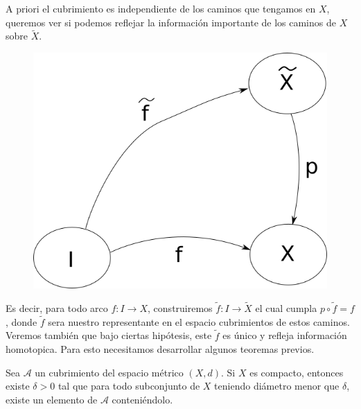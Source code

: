 A priori el cubrimiento es independiente de los caminos que tengamos
en \(X\), queremos ver si podemos reflejar la información importante de
los caminos de \(X\) sobre \(\tilde{X}\).
\begin{figure}[h]
  \centering
  \includegraphics[scale=0.3]{./imagenes/lifting-path.png}
\end{figure}
Es decir, para todo arco \(f : I \to X\), construiremos \(\tilde f : I
\to \tilde X\) el cual cumpla \(p \circ \tilde f = f \), donde \(\tilde
f\) sera nuestro representante en el espacio cubrimientos de estos
caminos. Veremos también que bajo ciertas hipótesis, este \(\tilde f\)
es único y refleja información homotopica. Para esto necesitamos
desarrollar algunos teoremas previos.
\begin{lema} \label{thm:lebesgue-number-lema}
  Sea \(\mathcal A\) un cubrimiento del espacio métrico \((X,d)\). Si
  \(X\) es compacto, entonces existe \(\delta > 0\) tal que para todo
  subconjunto de \(X\) teniendo diámetro menor que \(\delta\), existe un
  elemento de \(\mathcal A\) conteniéndolo.
\end{lema}

